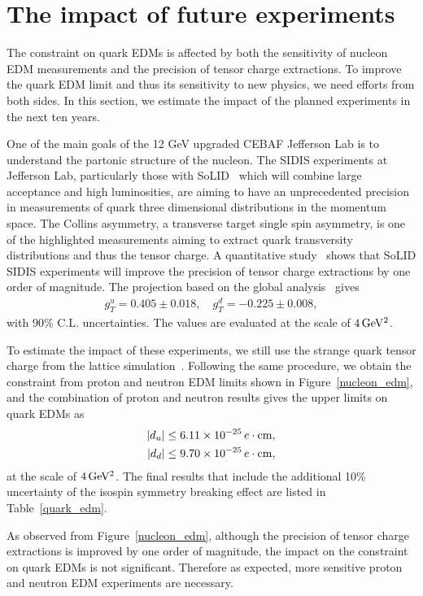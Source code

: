 \documentclass[aps,prd,twocolumn,groupedaddress,showpacs,superscriptaddress,floatfix,nofootinbib,10pt]{revtex4-1}
\begin{document}
\section{The impact of future experiments}

The constraint on quark EDMs is affected by both the sensitivity of nucleon EDM measurements and the precision of tensor charge extractions. To improve the quark EDM limit and thus its sensitivity to new physics, we need efforts from both sides. In this section, we estimate the impact of the planned experiments in the next ten years.

One of the main goals of the 12 GeV upgraded CEBAF Jefferson Lab is to understand the partonic structure of the nucleon. The SIDIS experiments at Jefferson Lab, particularly those with SoLID~\cite{Chen:2014psa} which will combine large acceptance and high luminosities, are aiming to have an unprecedented precision in measurements of quark three dimensional distributions in the momentum space. The Collins asymmetry, a transverse target single spin asymmetry, is one of the highlighted measurements aiming to extract quark transversity distributions and thus the tensor charge. A quantitative study~\cite{Ye:2016prn} shows that SoLID SIDIS experiments will improve the precision of tensor charge extractions by one order of magnitude. The projection based on the global analysis~\cite{Ye:2016prn} gives
\begin{align}
g_T^u=0.405\pm0.018,\quad g_T^d=-0.225\pm0.008,
\end{align}
with 90\% C.L. uncertainties. The values are evaluated at the scale of $4\,\rm GeV^2$.

To estimate the impact of these experiments, we still use the strange quark tensor charge from the lattice simulation~\cite{Bhattacharya:2015esa}. Following the same procedure, we obtain the constraint from proton and neutron EDM limits shown in Figure~\ref{nucleon_edm}, and the combination of proton and neutron results gives the upper limits on quark EDMs as
\begin{align}
|d_u|&\leq6.11\times10^{-25}\,e\cdot{\rm cm},\\
|d_d|&\leq9.70\times10^{-25}\,e\cdot{\rm cm},
\end{align}
at the scale of $4\,\rm GeV^2$. The final results that include the additional 10\% uncertainty of the isospin symmetry breaking effect are listed in Table~\ref{quark_edm}.

As observed from Figure~\ref{nucleon_edm}, although the precision of tensor charge extractions is improved by one order of magnitude, the impact on the constraint on quark EDMs is not significant. Therefore as expected, more sensitive proton and neutron EDM experiments are necessary.
\end{document}
